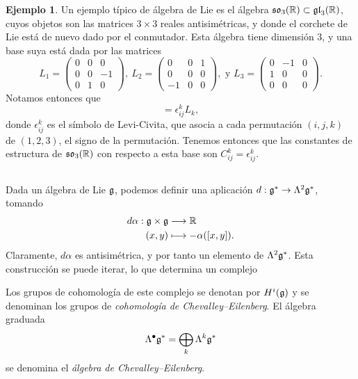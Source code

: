 \documentclass[11pt,a4paper]{amsbook}
\theoremstyle{remark} \newtheorem{rmk}[subsection]{Observación}
\theoremstyle{definition} \newtheorem{defn}[subsection]{Definición}
\theoremstyle{definition} \newtheorem{ex}[subsection]{Ejemplo}
\theoremstyle{definition} \newtheorem{ej}[subsection]{Ejercicio}
\begin{document}
\begin{ex}
  Un ejemplo típico de álgebra de Lie es el álgebra $\mathfrak{so}_3(\mathbb R)\subset \mathfrak{gl}_3(\mathbb R)$, cuyos objetos son las matrices $3\times 3$ reales antisimétricas, y donde el corchete de Lie está de nuevo dado por el conmutador. Esta álgebra tiene dimensión $3$, y una base suya está dada por las matrices
  \begin{equation*}
    L_1 =
    \begin{pmatrix}
      0 & 0 & 0 \\
      0 & 0 & -1 \\
      0 & 1 & 0
    \end{pmatrix},\
    L_2 =
    \begin{pmatrix}
      0 & 0 & 1 \\
      0 & 0 & 0 \\
      -1 & 0 & 0
    \end{pmatrix}, \text{ y }
    L_3 =
    \begin{pmatrix}
      0 & -1 & 0 \\
      1 & 0 & 0 \\
      0 & 0 & 0
    \end{pmatrix}.
  \end{equation*}
  Notamos entonces que
  \begin{equation*}
[L_i,L_j] = \epsilon_{ij}^k L_k,
  \end{equation*}
donde $\epsilon_{ij}^k$ es el símbolo de Levi-Civita, que asocia a cada permutación $(i,j,k)$ de $(1,2,3)$, el signo de la permutación. Tenemos entonces que las constantes de estructura de $\mathfrak{so}_3(\mathbb R)$ con respecto a esta base son $C_{ij}^k = \epsilon_{ij}^k$.
\end{ex}

\subsection{} Dada un álgebra de Lie $\mathfrak{g}$, podemos definir una aplicación $d:\mathfrak{g}^* \rightarrow \Lambda^2\mathfrak{g}^*$, tomando
\begin{align*}
  d\alpha: \mathfrak{g} \times \mathfrak{g} & \longrightarrow \mathbb R \\
  (x,y)  & \longmapsto -\alpha([x,y]).
\end{align*}
Claramente, $d\alpha$ es antisimétrica, y por tanto un elemento de $\Lambda^2 \mathfrak{g}^*$. Esta construcción se puede iterar, lo que determina un complejo
\begin{center}
\end{center}
Los grupos de cohomología de este complejo se denotan por $H^i(\mathfrak{g})$ y se denominan los grupos de \emph{cohomología de Chevalley--Eilenberg}. El álgebra graduada
\begin{equation*}
\Lambda^\bullet \mathfrak{g}^* = \bigoplus_{k} \Lambda^k \mathfrak{g}^*
\end{equation*}
se denomina el \emph{álgebra de Chevalley--Eilenberg}.
\end{document}
